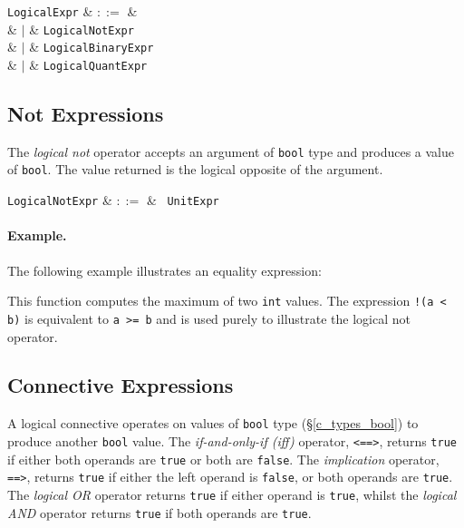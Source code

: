 \begin{syntax}
  \verb+LogicalExpr+ & $::=$ &\\
  & $|$ & \verb+LogicalNotExpr+\\
  & $|$ & \verb+LogicalBinaryExpr+\\
  & $|$ & \verb+LogicalQuantExpr+\\
\end{syntax}



\subsection{Not Expressions}
\label{c_expr_logical_not}

The {\em logical not} operator accepts an argument of \lstinline{bool} type and produces a value of \lstinline{bool}.  The value returned is the logical opposite of the argument.  

\begin{syntax}
\verb+LogicalNotExpr+ & $::=$ & \token{!}\ \verb+UnitExpr+\\
\end{syntax}

\paragraph{Example.}

The following example illustrates an equality expression:



This function computes the maximum of two \lstinline{int} values.  The expression \lstinline{!(a < b)} is equivalent to \lstinline{a >= b} and is used purely to illustrate the logical not operator.


\subsection{Connective Expressions}
\label{c_expr_logical_connectives}

A logical connective operates on values of \lstinline{bool} type (\S\ref{c_types_bool}) to produce another \lstinline{bool} value.  The {\em if-and-only-if (iff)} operator, \lstinline{<==>}, returns \lstinline{true} if either both operands are \lstinline{true} or both are \lstinline{false}.  The {\em implication} operator, \lstinline{==>}, returns \lstinline{true} if either the left operand is \lstinline{false}, or both operands are \lstinline{true}.  The {\em logical OR} operator returns \lstinline{true} if either operand is \lstinline{true}, whilst the {\em logical AND} operator returns \lstinline{true} if both operands are \lstinline{true}.

